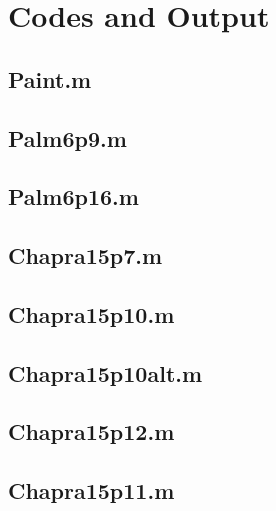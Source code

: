 \documentclass{article}
\begin{document}
 
\pagebreak
\appendix
\section{Codes and Output}

\subsection{Paint.m}

\subsection{Palm6p9.m}
\pagebreak

\subsection{Palm6p16.m}
\pagebreak

\subsection{Chapra15p7.m}
\pagebreak

\subsection{Chapra15p10.m}
\pagebreak

\subsection{Chapra15p10alt.m}
\pagebreak

\subsection{Chapra15p12.m}
\pagebreak

\subsection{Chapra15p11.m}
\pagebreak
\end{document}
